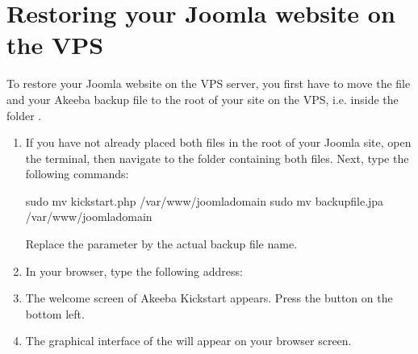 \documentclass[letterpaper,10pt,english]{sphinxmanual}
\begin{document}
\section{Restoring your Joomla website on the VPS}
\label{\detokenize{joomla-to-vps:restoring-your-joomla-website-on-the-vps}}
\sphinxAtStartPar
To restore your Joomla website on the VPS server, you first have to move the file  and your Akeeba backup file  to the root of your site on the VPS, i.e. inside the folder .
\begin{enumerate}
%
\item {} 
\sphinxAtStartPar
If you have not already placed both files in the root of your Joomla site, open the terminal, then navigate to the folder containing both files. Next, type the following commands:

\begin{sphinxVerbatim}[commandchars=\\\{\},numbers=left,firstnumber=1,stepnumber=1]
\PYGZdl{} sudo mv kickstart.php /var/www/joomla\PYGZhy{}domain
\PYGZdl{} sudo mv backup\PYGZhy{}file.jpa /var/www/joomla\PYGZhy{}domain
\end{sphinxVerbatim}

\sphinxAtStartPar
Replace the parameter  by the actual backup file name.

\item {} 
\sphinxAtStartPar
In your browser, type the following address:

\sphinxAtStartPar
{}

\item {} 
\sphinxAtStartPar
The welcome screen of Akeeba Kickstart appears. Press the button  on the bottom left.

\begin{figure}[htbp]
\centering

\noindent{}
\end{figure}

\item {} 
\sphinxAtStartPar
The graphical interface of the  will appear on your browser screen.


\end{enumerate}
\end{document}
